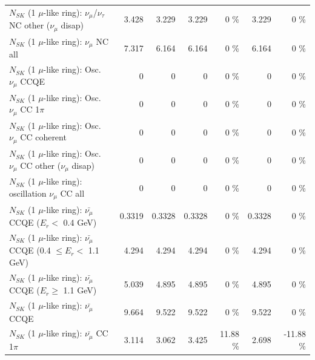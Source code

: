 \begin{table}
\begin{tabular}{| l | r | r | r  r | r  r |}
   $N_{SK}$ (1 $\mu$-like ring): $\nu_\mu$/$\nu_\tau$ NC other ($\nu_\mu$ disap) &           3.428 &           3.229 &           3.229 &        0 \%  &           3.229 &        0 \%  \\ 
                                $N_{SK}$ (1 $\mu$-like ring): $\nu_{\mu}$ NC all &           7.317 &           6.164 &           6.164 &        0 \%  &           6.164 &        0 \%  \\ 
\hline
\hline
                               $N_{SK}$ (1 $\mu$-like ring): Osc. $\nu_\mu$ CCQE &               0 &               0 &               0 &        0 \%  &               0 &        0 \%  \\ 
                          $N_{SK}$ (1 $\mu$-like ring): Osc. $\nu_\mu$ CC 1$\pi$ &               0 &               0 &               0 &        0 \%  &               0 &        0 \%  \\ 
                        $N_{SK}$ (1 $\mu$-like ring): Osc. $\nu_\mu$ CC coherent &               0 &               0 &               0 &        0 \%  &               0 &        0 \%  \\ 
         $N_{SK}$ (1 $\mu$-like ring): Osc. $\nu_\mu$ CC other ($\nu_\mu$ disap) &               0 &               0 &               0 &        0 \%  &               0 &        0 \%  \\ 
                      $N_{SK}$ (1 $\mu$-like ring): oscillation $\nu_\mu$ CC all &               0 &               0 &               0 &        0 \%  &               0 &        0 \%  \\ 
\hline
\hline
          $N_{SK}$ (1 $\mu$-like ring): $\bar{\nu_\mu}$ CCQE ($E_{r} <$ 0.4 GeV) &          0.3319 &          0.3328 &          0.3328 &        0 \%  &          0.3328 &        0 \%  \\ 
 $N_{SK}$ (1 $\mu$-like ring): $\bar{\nu_\mu}$ CCQE (0.4 $\leq E_{r} <$ 1.1 GeV) &           4.294 &           4.294 &           4.294 &        0 \%  &           4.294 &        0 \%  \\ 
       $N_{SK}$ (1 $\mu$-like ring): $\bar{\nu_\mu}$ CCQE ($E_{r} \geq$ 1.1 GeV) &           5.039 &           4.895 &           4.895 &        0 \%  &           4.895 &        0 \%  \\ 
\hline
                              $N_{SK}$ (1 $\mu$-like ring): $\bar{\nu_\mu}$ CCQE &           9.664 &           9.522 &           9.522 &        0 \%  &           9.522 &        0 \%  \\ 
                         $N_{SK}$ (1 $\mu$-like ring): $\bar{\nu_\mu}$ CC 1$\pi$ &           3.114 &           3.062 &           3.425 &    11.88 \%  &           2.698 &   -11.88 \%  \\ 

\end{tabular}
\end{table}

